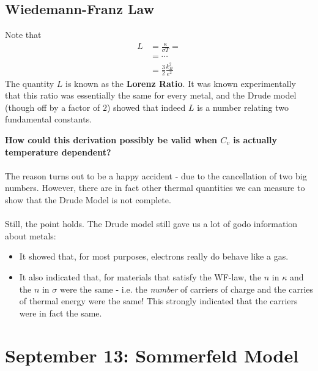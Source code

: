 \documentclass[11pt]{article}
\begin{document}
\subsection{Wiedemann-Franz Law}
Note that
\begin{align*}
  L &= \frac{\kappa}{\sigma T} = \\
  &= \cdots \\
  &= \frac{3}{2} \frac{k_B^2}{e^2}
\end{align*} The quantity $L$ is known as the \textbf{Lorenz Ratio}. It was known experimentally that this ratio was essentially the same for every metal, and the Drude model (though off by a factor of $2$) showed that indeed $L$ is a number relating two fundamental constants.

\begin{redbox}
  \textbf{How could this derivation possibly be valid when $C_v$ is actually temperature dependent?}
  \\
  \\
  The reason turns out to be a happy accident - due to the cancellation of two big numbers. However, there are in fact other thermal quantities we can measure to show that the Drude Model is not complete.
  \\
  \\
  Still, the point holds. The Drude model still gave us a lot of godo information about metals:
  \begin{itemize}
    \item It showed that, for most purposes, electrons really do behave like a gas.
    \item It also indicated that, for materials that satisfy the WF-law, the $n$ in $\kappa$ and the $n$ in $\sigma$ were the same - i.e. the \textit{number} of carriers of charge and the carries of thermal energy were the same! This strongly indicated that the carriers were in fact the same.
  \end{itemize}
\end{redbox}



\pagebreak
\section{September 13: Sommerfeld Model}
\end{document}
